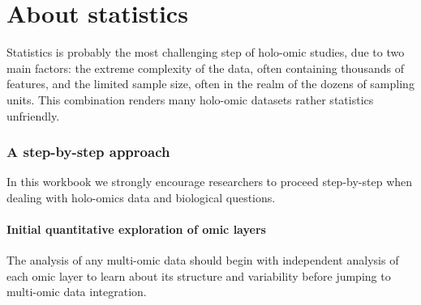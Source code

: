 \documentclass[
]{book}
\begin{document}
\hypertarget{about-statistics}{%
\chapter{About statistics}\label{about-statistics}}

Statistics is probably the most challenging step of holo-omic studies, due to two main factors: the extreme complexity of the data, often containing thousands of features, and the limited sample size, often in the realm of the dozens of sampling units. This combination renders many holo-omic datasets rather statistics unfriendly.

\hypertarget{a-step-by-step-approach}{%
\subsection*{A step-by-step approach}\label{a-step-by-step-approach}}

In this workbook we strongly encourage researchers to proceed step-by-step when dealing with holo-omics data and biological questions.

\hypertarget{initial-quantitative-exploration-of-omic-layers}{%
\subsubsection*{Initial quantitative exploration of omic layers}\label{initial-quantitative-exploration-of-omic-layers}}

The analysis of any multi-omic data should begin with independent analysis of each omic layer to learn about its structure and variability before jumping to multi-omic data integration.
\end{document}
